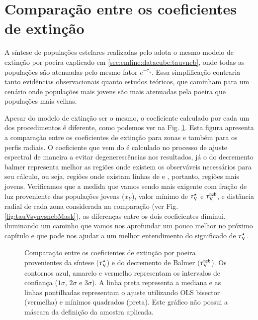 \section{Comparação entre os coeficientes de extinção}
\label{sec:synvsneb:tauv}

A síntese de populações estelares realizadas pelo \starlight adota o mesmo modelo de extinção por
poeira explicado em \ref{sec:emline:datacube:tauvneb}, onde todas as populações são atenuadas pelo
mesmo fator $e^{-\tau_\lambda}$. Essa simplificação contraria tanto evidências observacionais quanto
estudos teóricos, que caminham para um cenário onde populações mais jovens são mais atenuadas pela
poeira que populações mais velhas. 

Apesar do modelo de extinção ser o mesmo, o coeficiente calculado por cada um dos procedimentos é
diferente, como podemos ver na Fig. \ref{fig:tauVsynvsneb}. Esta figura apresenta a comparação entre
os coeficientes de extinção para zonas e também para os perfis radiais. O coeficiente que vem do
\starlight é calculado no processo de ajuste espectral de maneira a evitar degenerescências nos
resultados, já o do decremento balmer representa melhor as regiões onde existem os observáveis
necessários para seu cálculo, ou seja, regiões onde existam linhas de \Halpha e \Hbeta, portanto,
regiões mais jovens. Verificamos que a medida que vamos sendo mais exigente com fração de luz
proveniente das populações jovens ($x_Y$), valor mínimo de $\tau_{\mathrm{V}}^\star$ e $\tau_{\mathrm{V}}^{\mathrm{neb}}$, e distância radial
de cada zona considerada na comparação (ver Fig. \ref{fig:tauVsynvsnebMask}), as diferenças entre os
dois coeficientes diminui, iluminando um caminho que vamos nos aprofundar um pouco melhor no próximo
capítulo e que pode nos ajudar a um melhor entendimento do significado de $\tau_{\mathrm{V}}^\star$.

\begin{figure}
	\centering
	\caption[Comparação entre os coeficientes de extinção.] 
	{Comparação entre os coeficientes de extinção por poeira provenientes da síntese ($\tau_{\mathrm{V}}^\star$) e
	do decremento de Balmer ($\tau_{\mathrm{V}}^{\mathrm{neb}}$). Os contornos azul, amarelo e vermelho representam os intervalos
	de confiança ($1\sigma$, $2\sigma$ e $3\sigma$). A linha preta representa a mediana e as linhas
	pontilhadas representam o ajuste utilizando OLS bisector (vermelha) e mínimos quadrados (preta).
	Este gráfico não possui a máscara da definição da amostra aplicada. }
	\label{fig:tauVsynvsneb}
\end{figure}

